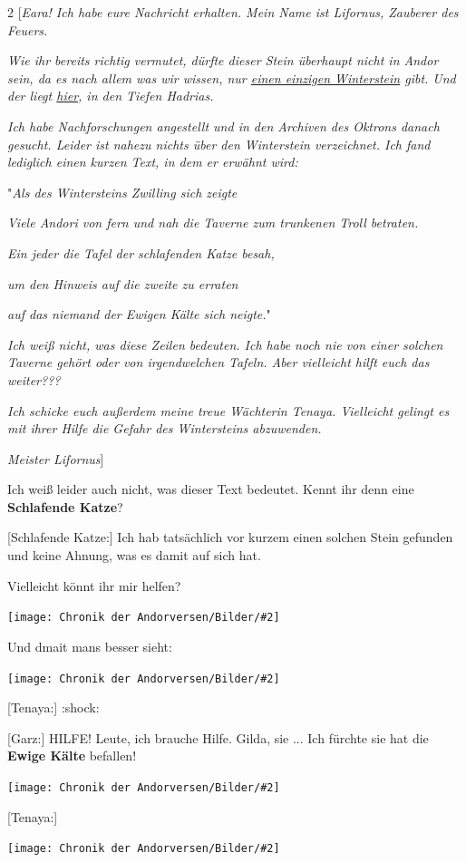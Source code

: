 \documentclass[10pt, a4paper, oneside]{book}
\newcommand{\bildmitts}[2][height=0.32\textwidth,width=0.48\textwidth,keepaspectratio]{%
    \begin{center}
        \texttt{[image: Chronik der Andorversen/Bilder/\#2]}
    \end{center}
}
\begin{document}
\begin{multicols}{2}
[\textit{Eara! Ich habe eure Nachricht erhalten. Mein Name ist Lifornus, Zauberer des Feuers.}

\textit{Wie ihr bereits richtig vermutet, dürfte dieser Stein überhaupt nicht in Andor sein, da es nach allem was wir wissen, nur \underline{einen einzigen Winterstein} gibt. Und der liegt \underline{hier}, in den Tiefen Hadrias.}

\textit{Ich habe Nachforschungen angestellt und in den Archiven des Oktrons danach gesucht. Leider ist nahezu nichts über den Winterstein verzeichnet. Ich fand lediglich einen kurzen Text, in dem er erwähnt wird:}

"\textit{Als des Wintersteins Zwilling sich zeigte}

\textit{Viele Andori von fern und nah die Taverne zum trunkenen Troll betraten.}

\textit{Ein jeder die Tafel der schlafenden Katze besah, }

\textit{um den Hinweis auf die zweite zu erraten }

\textit{auf das niemand der Ewigen Kälte sich neigte.}" 

\textit{Ich weiß nicht, was diese Zeilen bedeuten. Ich habe noch nie von einer solchen Taverne gehört oder von irgendwelchen Tafeln. Aber vielleicht hilft euch das weiter???}

\textit{Ich schicke euch außerdem meine treue Wächterin Tenaya. Vielleicht gelingt es mit ihrer Hilfe die Gefahr des Wintersteins abzuwenden.}

\textit{Meister Lifornus}]

Ich weiß leider auch nicht, was dieser Text bedeutet. Kennt ihr denn eine \textbf{Schlafende Katze}?

[Schlafende Katze:] Ich hab tatsächlich vor kurzem einen solchen Stein gefunden und keine Ahnung, was es damit auf sich hat.

Vielleicht könnt ihr mir helfen?

\bildmitts{AA2022 Tavernen-Party 11.jpeg}

Und dmait mans besser sieht:

\bildmitts{AA2022 Tavernen-Party 12.jpeg}

[Tenaya:] :shock:

[Garz:] HILFE! Leute, ich brauche Hilfe. Gilda, sie ... Ich fürchte sie hat die \textbf{Ewige Kälte} befallen!

\bildmitts{AA2022 Tavernen-Party 13.jpeg}

[Tenaya:]

\bildmitts{AA2022 Tavernen-Party 14.jpeg}


\end{multicols}
\end{document}
